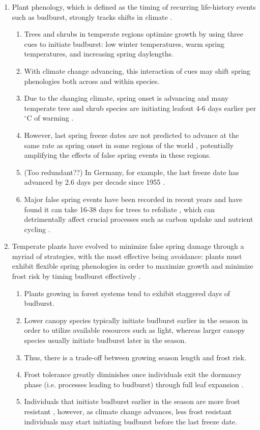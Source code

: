 \documentclass{article}\usepackage[]{graphicx}\usepackage[]{color}
\begin{document}
\begin{enumerate}
\item Plant phenology, which is defined as the timing of recurring life-history events such as budburst, strongly tracks shifts in climate \citep{Cleland2007, Wolkovich2012}.
\begin{enumerate}
\item Trees and shrubs in temperate regions optimize growth by using three cues to initiate budburst: low winter temperatures, warm spring temperatures, and increasing spring daylengths.
\item With climate change advancing, this interaction of cues may shift spring phenologies both across and within species. 
\item Due to the changing climate, spring onset is advancing and many temperate tree and shrub species are initiating leafout 4-6 days earlier per $^{\circ}$C of warming \citep{Wolkovich2012, IPCC2014}.
\item However, last spring freeze dates are not predicted to advance at the same rate as spring onset in some regions of the world \citep{Inouye2008, Martin2010, Labe2016, Sgubin2018}, potentially amplifying the effects of false spring events in these regions.
\item (Too redundant??) In Germany, for example, the last freeze date has advanced by 2.6 days per decade since 1955 \citep{Zohner2016}.
\item Major false spring events have been recorded in recent years and have found it can take 16-38 days for trees to refoliate \citep{Gu2008, Augspurger2009, Augspurger2013, Menzel2015}, which can detrimentally affect crucial processes such as carbon updake and nutrient cycling \citep{Hufkens2012, Richardson2013, Klosterman2018}.
\end{enumerate}


\item Temperate plants have evolved to minimize false spring damage through a myriad of strategies, with the most effective being avoidance: plants must exhibit flexible spring phenologies in order to maximize growth and minimize frost risk by timing budburst effectively \citep{Polgar2011, Basler2014}.
\begin{enumerate}
\item Plants growing in forest systems tend to exhibit staggered days of budburst.
\item Lower canopy species typically initiate budburst earlier in the season in order to utilize available resources such as light, whereas larger canopy species usually initiate budburst later in the season.
\item Thus, there is a trade-off between growing season length and frost risk. 
\item Frost tolerance greatly diminishes once individuals exit the dormancy phase (i.e. processes leading to budburst) through full leaf expansion \citep{Vitasse2014, Lenz2016}.
\item Individuals that initiate budburst earlier in the season are more frost resistant \citep{Korner2016}, however, as climate change advances, less frost resistant individuals may start initiating budburst before the last freeze date.
\end{enumerate}


\end{enumerate}
\end{document}
